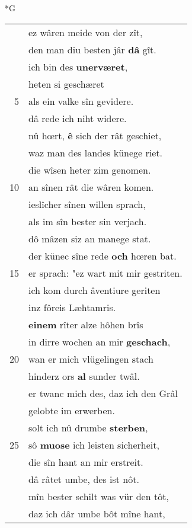 \documentclass[8pt,a4paper,notitlepage]{article}
\begin{document}
\newpage
\begin{table}[ht]
\begin{minipage}[t]{0.5\linewidth}
\small
\begin{center}*G
\end{center}
\begin{tabular}{rl}
 & ez wâren meide von der zît,\\ 
 & den man diu besten jâr \textbf{dâ} gît.\\ 
 & ich bin des \textbf{unerværet},\\ 
 & heten si geschæret\\ 
5 & als ein valke sîn gevidere.\\ 
 & dâ rede ich niht widere.\\ 
 & nû hœrt, \textbf{ê} sich der rât geschiet,\\ 
 & waz man des landes künege riet.\\ 
 & die wîsen heter zim genomen.\\ 
10 & an sînen rât die wâren komen.\\ 
 & ieslîcher sînen willen sprach,\\ 
 & als im sîn bester sin verjach.\\ 
 & dô mâzen siz an manege stat.\\ 
 & der künec sîne rede \textbf{och} hœren bat.\\ 
15 & er sprach: "ez wart mit mir gestriten.\\ 
 & ich kom durch âventiure geriten\\ 
 & inz fôreis Læhtamris.\\ 
 & \textbf{einem} rîter alze hôhen brîs\\ 
 & in dirre wochen an mir \textbf{geschach},\\ 
20 & wan er mich vlügelingen stach\\ 
 & hinderz ors \textbf{al} sunder twâl.\\ 
 & er twanc mich des, daz ich den Grâl\\ 
 & gelobte im erwerben.\\ 
 & solt ich nû drumbe \textbf{sterben},\\ 
25 & sô \textbf{muose} ich leisten sicherheit,\\ 
 & die sîn hant an mir erstreit.\\ 
 & dâ râtet umbe, des ist nôt.\\ 
 & mîn bester schilt was vür den tôt,\\ 
 & daz ich dâr umbe bôt mîne hant,\\ 

\end{tabular}
\end{minipage}
\end{table}
\end{document}
